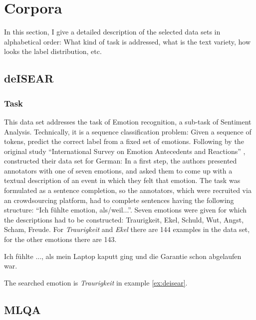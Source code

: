 \section{Corpora}

In this section, I give a detailed description of the selected data sets in alphabetical order:
What kind of task is addressed, what is the text variety, how looks the label distribution, etc.

\subsection{deISEAR}

\subsubsection{Task}

This data set addresses the task of Emotion recognition, a sub-task of Sentiment Analysis.
Technically, it is a sequence classification problem: Given a sequence of tokens, predict the correct label from a fixed set of emotions.
Following by the original study ``International Survey on Emotion Antecedents and Reactions'' \citep{scherer1994evidence}, \cite{troiano2019crowdsourcing} constructed their data set for German:
In a first step, the authors presented annotators with one of seven emotions, and asked them to come up with a textual description of an event in which they felt that emotion.
The task was formulated as a sentence completion, so the annotators, which were recruited via an crowdsourcing platform, had to complete sentences having the following structure: ``Ich fühlte {emotion}, als/weil...''.
Seven emotions were given for which the descriptions had to be constructed:
Traurigkeit, Ekel, Schuld, Wut, Angst, Scham, Freude.
For \emph{Traurigkeit} and \emph{Ekel} there are 144 examples in the data set, for the other emotions there are 143.

\begin{examples}
	\label{ex:deisear}
	\item Ich fühlte ..., als mein Laptop kaputt ging und die Garantie schon abgelaufen war.
\end{examples}

The searched emotion is \emph{Traurigkeit} in example \ref{ex:deisear}.


\subsection{MLQA}

